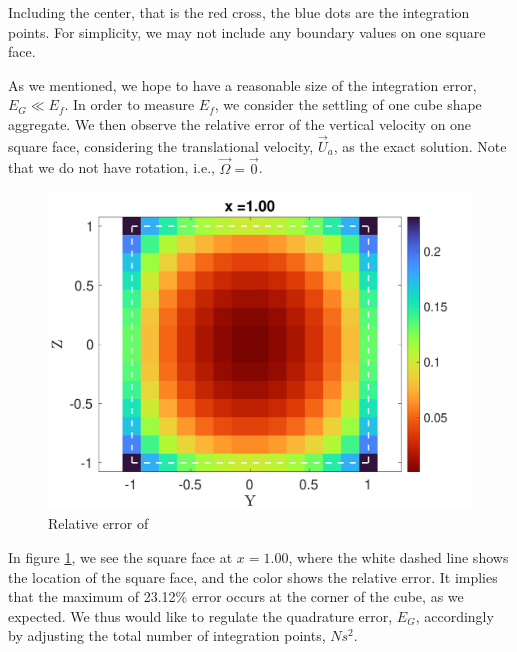 Including the center, that is the red cross, the blue dots are the integration points.
For simplicity, we may not include any boundary values on one square face.
\par
As we mentioned, we hope to have a reasonable size of the integration error, $E_G \ll E_f$.
In order to measure $E_f$, we consider the settling of one cube shape aggregate.
We then observe the relative error of the vertical velocity on one square face, considering the translational velocity, $\vec{U}_a$, as the exact solution. Note that we do not have rotation, i.e., $\vec{\Omega} = \vec{0}$. 
\begin{figure}[h]
	\begin{center}
		\includegraphics[scale=0.3]{./figures/fig_corner_err}
	\caption{Relative error of }
	\label{fig_corner_err}
\end{center}
\end{figure}
In figure \ref{fig_corner_err}, we see the square face at $x = 1.00$, where the white dashed line shows the location of the square face, and the color shows the relative error. It implies that the maximum of 23.12$\%$ error occurs at the corner of the cube, as we expected. We thus would like to regulate the quadrature error, $E_G$, accordingly by adjusting the total number of integration points, $Ns^2$.
